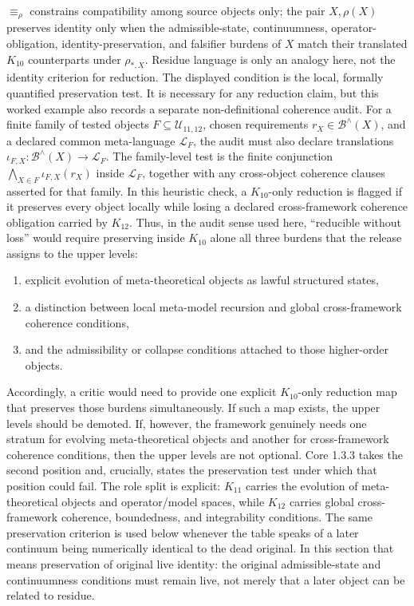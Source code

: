 \(\equiv_{\rho}\) constrains compatibility among source objects only; the
pair \(X,\rho(X)\) preserves identity only when the admissible-state,
continuumness, operator-obligation, identity-preservation, and falsifier
burdens of \(X\) match their translated \(K_{10}\) counterparts under
\(\rho_{\ast,X}\). Residue language
is only an analogy here, not the identity criterion for reduction.
The displayed condition is the local, formally quantified preservation test.
It is necessary for any reduction claim, but this worked example also records
a separate non-definitional coherence audit. For a finite family of tested
objects \(F\subseteq\mathcal{U}_{11,12}\), chosen requirements
\(r_X\in\mathcal{B}^{\wedge}(X)\), and a declared common meta-language
\(\mathcal{L}_F\), the audit must also declare translations
\(\iota_{F,X}:\mathcal{B}^{\wedge}(X)\to\mathcal{L}_F\). The family-level
test is the finite conjunction
\(\bigwedge_{X\in F}\iota_{F,X}(r_X)\) inside \(\mathcal{L}_F\), together
with any cross-object coherence clauses asserted for that family. In this
heuristic check, a
\(K_{10}\)-only reduction is flagged if it preserves every object locally
while losing a declared cross-framework coherence obligation carried by
\(K_{12}\). Thus, in the audit sense used here, ``reducible without loss''
would require preserving inside \(K_{10}\) alone all three burdens that the
release assigns to the upper levels:
\begin{enumerate}
\item explicit evolution of meta-theoretical objects as lawful structured
      states,
\item a distinction between local meta-model recursion and global
      cross-framework coherence conditions,
\item and the admissibility or collapse conditions attached to those
      higher-order objects.
\end{enumerate}
Accordingly, a critic would need to provide one explicit \(K_{10}\)-only
reduction map that preserves those burdens simultaneously. If such a map
exists, the upper levels should be demoted. If, however, the framework
genuinely needs one stratum for evolving meta-theoretical objects and another
for cross-framework coherence conditions, then the upper levels are not
optional. Core 1.3.3 takes the second position and, crucially, states the
preservation test under which that position could fail.
The role split is explicit: \(K_{11}\) carries the evolution of
meta-theoretical objects and operator/model spaces, while \(K_{12}\) carries
global cross-framework coherence, boundedness, and integrability conditions.
The same preservation criterion is used below whenever the table speaks of a
later continuum being numerically identical to the dead original. In this
section that means preservation of original live identity: the original
admissible-state and continuumness conditions must remain live, not merely
that a later object can be related to residue.

